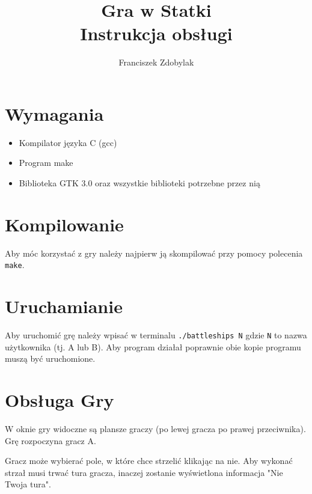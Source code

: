 \documentclass[a4paper]{article}
\author{Franciszek Zdobylak}
\title{\Huge{\bf{Gra w Statki}}\\
				\normalsize Instrukcja obsługi}
\begin{document}
\maketitle

\section{Wymagania}
\begin{itemize}
    \item Kompilator języka C (gcc)
    \item Program make
    \item Biblioteka GTK 3.0 oraz wszystkie biblioteki potrzebne przez nią
\end{itemize}

\section{Kompilowanie}
Aby móc korzystać z gry należy najpierw ją skompilować przy pomocy polecenia \texttt{make}.

\section{Uruchamianie}
Aby uruchomić grę należy wpisać w terminalu \texttt{./battleships N} gdzie \texttt{N} to nazwa użytkownika
(tj. A lub B). Aby program działał poprawnie obie kopie programu muszą być uruchomione.

\section{Obsługa Gry}
W oknie gry widoczne są plansze graczy (po lewej gracza po prawej przeciwnika). Grę rozpoczyna gracz A.

Gracz może wybierać pole, w które chce strzelić klikając na nie. Aby wykonać strzał musi trwać tura gracza,
inaczej zostanie wyświetlona informacja "Nie Twoja tura".
\end{document}
